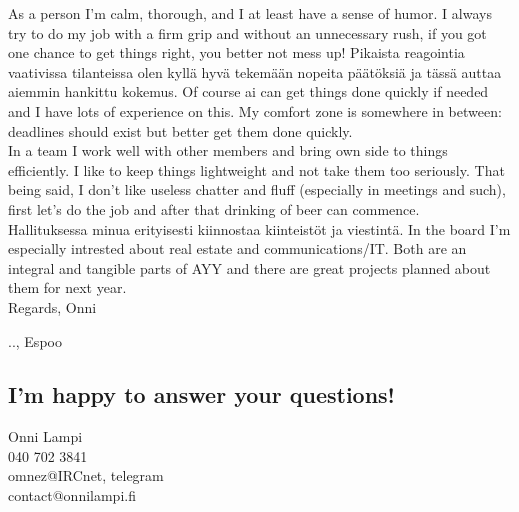 \documentclass[a4paper, 12pt, english]{report}
\newcommand*{\findate}{\the\day.\the\month.\the\year}
\begin{document}
As a person I'm calm, thorough, and I at least have a sense of humor.
I always try to do my job with a firm grip and without an unnecessary rush, if you got one chance to get things right, you better not mess up!
Pikaista reagointia vaativissa tilanteissa olen kyllä hyvä tekemään nopeita päätöksiä ja tässä auttaa aiemmin hankittu kokemus.
Of course ai can get things done quickly if needed and I have lots of experience on this.
My comfort zone is somewhere in between: deadlines should exist but better get them done quickly.\\

In a team I work well with other members and bring own side to things efficiently.
I like to keep things lightweight and not take them too seriously.
That being said, I don't like useless chatter and fluff (especially in meetings and such), first let's do the job and after that drinking of beer can commence.\\

Hallituksessa minua erityisesti kiinnostaa kiinteistöt ja viestintä.
In the board I'm especially intrested about real estate and communications/IT.
Both are an integral and tangible parts of AYY and there are great projects planned about them for next year.\\



Regards, Onni

\findate, Espoo

\subsection*{I'm happy to answer your questions!}
Onni Lampi\\
040 702 3841\\
omnez@IRCnet, telegram\\
contact@onnilampi.fi
\end{document}
